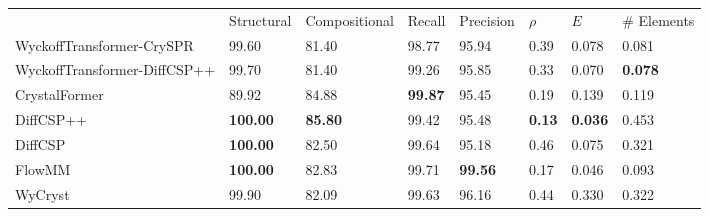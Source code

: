 \begin{tabular}{llllllll}
{} & {Structural} & {Compositional} & {Recall} & {Precision} & {$\rho$} & {$E$} & {# Elements} \\
WyckoffTransformer-CrySPR & 99.60 & 81.40 & 98.77 & 95.94 & 0.39 & 0.078 & 0.081 \\
WyckoffTransformer-DiffCSP++ & 99.70 & 81.40 & 99.26 & 95.85 & 0.33 & 0.070 & \bfseries 0.078 \\
CrystalFormer & 89.92 & 84.88 & \bfseries 99.87 & 95.45 & 0.19 & 0.139 & 0.119 \\
DiffCSP++ & \bfseries 100.00 & \bfseries 85.80 & 99.42 & 95.48 & \bfseries 0.13 & \bfseries 0.036 & 0.453 \\
DiffCSP & \bfseries 100.00 & 82.50 & 99.64 & 95.18 & 0.46 & 0.075 & 0.321 \\
FlowMM & \bfseries 100.00 & 82.83 & 99.71 & \bfseries 99.56 & 0.17 & 0.046 & 0.093 \\
WyCryst & 99.90 & 82.09 & 99.63 & 96.16 & 0.44 & 0.330 & 0.322 \\
\end{tabular}
